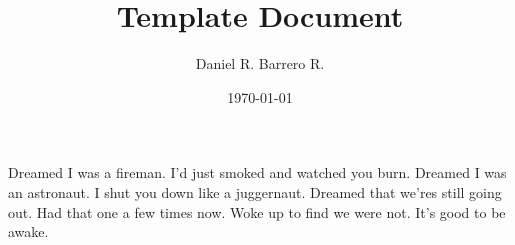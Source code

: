 \documentclass{amsart}
\title{Template Document}
\author{Daniel R. Barrero R.}
\date{\today}
\begin{document}
\maketitle

\section{}

Dreamed I was a fireman. I'd just smoked and watched you burn. Dreamed I was an astronaut. I shut
you down like a juggernaut.
Dreamed that we'res still going out. Had that one a few times now.
Woke up to find we were not. It's good to be awake.



\end{document}
